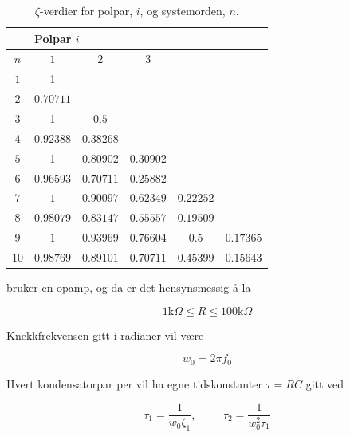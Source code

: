 \begin{table}[!h]
    \centering
    \caption{$\zeta$-verdier for polpar, $i$, og systemorden, $n$.}
    \label{tab:zeta}
    \begin{tabular}{|c|c|c|c|c|c|}
    \hline
        & \multicolumn{5}{l|}{Polpar $i$}   \\ \hline
    $n$ & $1$       & $2$       & $3$       &      &   \\ \hline
    $1$ & 1         &           &           &      &   \\ \hline
    $2$ & $0.70711$ &           &           &      &   \\ \hline
    $3$ & 1         & $0.5$     &           &      &   \\ \hline
    $4$ & $0.92388$ & $0.38268$ &           &      &   \\ \hline
    $5$ & 1         & $0.80902$ & $0.30902$ &      &   \\ \hline
    $6$ & $0.96593$ & $0.70711$ & $0.25882$ &      &   \\ \hline
    $7$ & $1$ & $0.90097$ & $0.62349$ & $0.22252$     &   \\ \hline
    $8$ & $0.98079$ & $0.83147$ & $0.55557$ &  $0.19509$    &  \\ \hline
    $9$ & $1$ & $0.93969$ & $0.76604$ & $0.5$     &  $0.17365$ \\ \hline
    $10$ & $0.98769$ & $0.89101$ & $0.70711$ &  $0.45399$    & $0.15643$  \\ \hline
    \end{tabular}
    \end{table}

 bruker en opamp, og da er det hensynsmessig å la 

\begin{equation}
    1\text{k}\Omega\leq R\leq100\text{k}\Omega
\end{equation}

Knekkfrekvensen gitt i radianer vil være

\begin{equation}
    w_0=2\pi f_0
\end{equation}

Hvert kondensatorpar per  vil ha egne tidskonstanter $\tau=RC$ gitt ved

\begin{equation}
    \tau_1=\frac{1}{w_0\zeta_1}, \hspace{1cm} \tau_2=\frac{1}{w_0^2\tau_1}
\end{equation}


